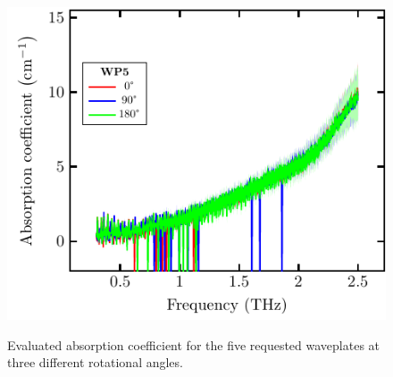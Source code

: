 \begin{figure}[H]
\subcaptionbox{\label{fig:ceramic_WP5_abs}}
    {\includegraphics[width=0.45\linewidth]{images/7_appendix/plots/real_abs/WP5.pdf}}
\caption{Evaluated absorption coefficient for the five requested waveplates at three different rotational angles.}
\label{fig:ceramic_WPs_abs}
\end{figure}


